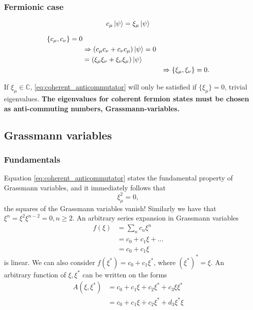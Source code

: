 \subsubsection*{Fermionic case}

\begin{equation}
c_\mu \ket{\psi} = \xi_\mu\ket{\psi}
\end{equation}

\begin{align}
\{c_\mu, c_\nu\} = 0 && \nonumber \\
&\Rightarrow\left(c_\mu c_\nu + c_\nu c_\mu\right)\ket{\psi} = 0 &\nonumber \\
&=\left(\xi_\mu\xi_\nu + \xi_\nu\xi_\mu\right)\ket{\psi} &\nonumber \\
&&\Rightarrow \{\xi_\mu,\xi_\nu\} = 0.\label{eq:coherent_anticommutator}
\end{align}

If $\xi_\mu\in\mathbb{C}$, \eqref{eq:coherent_anticommutator} will only be satisfied if $\{\xi_\mu\} = 0$, trivial eigenvalues. \textbf{The eigenvalues for coherent fermion states must be chosen as anti-commuting numbers, Grassmann-variables.}

\subsection{Grassmann variables}
\subsubsection*{Fundamentals}
	
Equation \eqref{eq:coherent_anticommutator} states the fundamental property of Grassmann variables, and it immediately follows that 
\begin{equation}
\xi_\mu^2 = 0,
\end{equation}
the squares of the Grassmann variables vanish!
Similarly we have that $\xi^n = \xi^2\xi^{n-2} = 0, n \ge 2$.
An arbitrary series expansion in Grassmann variables
\begin{align}
f(\xi) &= \sum_nc_n\xi^n \nonumber \\
&=c_0 + c_1\xi + \dots \nonumber\\
&= c_0 + c_1\xi
\end{align}
is linear. We can also consider $f(\xi^*) = c_0 + c_1\xi^*$, where $\left(\xi^*\right)^* = \xi$.
An arbitrary function of $\xi, \xi^*$ can be written on the forms
\begin{align}
\label{eq:grassmann_function}
A\left(\xi, \xi^*\right) &= c_0 + c_1\xi + c_2\xi^*+c_3\xi\xi^* \\
&= c_0 + c_1\xi + c_2\xi^*+d_3\xi^*\xi
\end{align}

